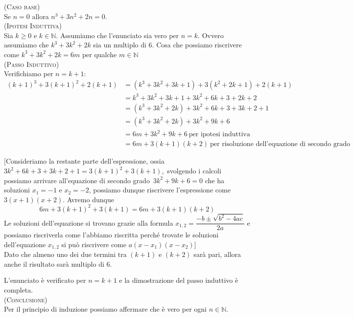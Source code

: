 \begin{soluzione}
\textsc{(Caso base)}\\
Se $n = 0$ allora $n^3 + 3n^2 + 2n = 0$.\\

\textsc{(Ipotesi Induttiva)}\\
Sia $k \geqslant 0$ e $k \in \mathbb{N}$. Assumiamo che l'enunciato sia vero per $n = k$. Ovvero assumiamo che $k^3 + 3k^2 + 2k$ sia un multiplo di 6. Cosa che possiamo riscrivere come $k^3 + 3k^2 + 2k=6m$ per qualche $m \in \mathbb{N}$\\

\textsc{(Passo Induttivo)}\\
Verifichiamo per $n = k+1$:
\begin{align*}
(k + 1)^3 + 3(k + 1)^2 + 2(k + 1) &= (k^3 + 3k^2 + 3k + 1) + 3(k^2 + 2k + 1) + 2(k + 1)\\
&= k^3 + 3k^2 + 3k + 1 + 3k^2 + 6k + 3 + 2k+2\\
&= (k^3+3k^2+2k) + 3k^2 + 6k + 3 + 3k + 2 +1\\
&= (k^3+3k^2+2k) + 3k^2+9k+6\\ 
&= 6m + 3k^2+9k+6\ \text{per ipotesi induttiva}\\
&= 6m + 3(k+1)(k+2)\ \text{per risoluzione dell'equazione di secondo grado}
\end{align*}

[Consideriamo la restante parte dell'espressione, ossia~$3k^2 + 6k + 3 + 3k + 2 +1=3(k + 1)^2 + 3(k + 1)$,~svolgendo i calcoli possiamo arrivare all'equazione di secondo grado~$3k^2+9k+6=0$ che ha soluzioni $x_1=-1$ e $x_2=-2$, possiamo dunque riscrivere l'espressione come $3(x+1)(x+2)$. Avremo dunque $$6m + 3(k + 1)^2 + 3(k + 1)=6m+3(k+1)(k+2)$$
Le soluzioni dell'equazione si trovano grazie alla formula $x_{1,2}=\dfrac{-b\pm\sqrt{b^2-4ac}}{2a}$ e possiamo riscriverla come l'abbiamo riscritta perché trovate le soluzioni dell'equazione $x_{1,2}$ si può riscrivere come $a(x-x_1)(x-x_2)$]\\
				
Dato che almeno uno dei due termini tra $(k+1)$ e $(k+2)$ sarà pari, allora anche il risultato sarà multiplo di 6. 

L'enunciato è verificato per $n = k+1$ e la dimostrazione del passo induttivo è completa.\\
		
\textsc{(Conclusione)}\\
Per il principio di induzione possiamo affermare che  è vero per ogni $n \in \mathbb{N}$.\\
\end{soluzione}


